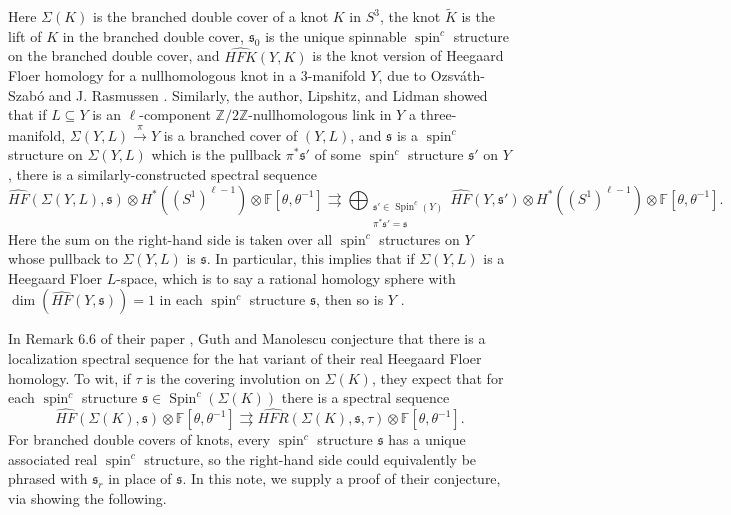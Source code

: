 \documentclass[11pt,reqno]{amsart}
\theoremstyle{definition}
\theoremstyle{remark}
\renewcommand{\subset}{\subseteq}
\DeclareMathOperator{\spin}{{spin}}
\DeclareMathOperator{\Spin}{{Spin}}
\newcommand{\bF}{\mathbb{F}}
\newcommand{\HF}{\mathit{HF}}
\newcommand{\HFK}{\mathit{HFK}}
\newcommand\HFhat{\widehat{\HF}}
\newcommand\HFKhat{\widehat{\HFK}}
\numberwithin{equation}{section}
\begin{document}
Here $\Sigma(K)$ is the branched double cover of a knot $K$ in $S^3$, the knot $\widetilde{K}$ is the lift of $K$ in the branched double cover, $\mathfrak s_0$ is the unique spinnable $\spin^c$ structure on the branched double cover, and $\HFKhat(Y,K)$ is the knot version of Heegaard Floer homology for a nullhomologous knot in a 3-manifold $Y$, due to Ozsv{\'a}th-Szab{\'o} \cite{OSKnots, OSLinks} and J. Rasmussen \cite{RasmussenKnots}. Similarly, the author, Lipshitz, and Lidman \cite{HLL:branched} showed that if $L \subset Y$ is an $\ell$-component $\mathbb Z/2\mathbb Z$-nullhomologous link in $Y$ a three-manifold, $\Sigma(Y,L) \xrightarrow{\pi} Y$ is a branched cover of $(Y,L)$, and $\mathfrak s$ is a $\spin^c$ structure on $\Sigma(Y,L)$ which is the pullback $\pi^{*}\mathfrak s'$ of some $\spin^c$ structure $\mathfrak s'$ on $Y$, there is a similarly-constructed spectral sequence
%
\begin{equation}\label{eqn:original-manifolds} \HFhat(\Sigma(Y,L), \mathfrak s) \otimes H^*((S^1)^{\ell -1}) \otimes  \bF[\theta, \theta^{-1}] \rightrightarrows \bigoplus_{\substack{\mathfrak s'\in \Spin^c(Y) \\ \pi^* \mathfrak s' = \mathfrak s}} \HFhat(Y, \mathfrak s') \otimes H^*((S^1)^{\ell -1}) \otimes \bF[\theta, \theta^{-1}].\end{equation}
%
Here the sum on the right-hand side is taken over all $\spin^c$ structures on $Y$ whose pullback to $\Sigma(Y,L)$ is $\mathfrak s$. In particular, this implies that if $\Sigma(Y,L)$ is a Heegaard Floer $L$-space, which is to say a rational homology sphere with $\dim (\HFhat(Y, \mathfrak s)) = 1$ in each $\spin^c$ structure $\mathfrak s$, then so is $Y$ \cite[Corollary 1.2]{HLL:branched}.

In Remark 6.6 of their paper \cite{GM:real}, Guth and Manolescu conjecture that there is a localization spectral sequence for the hat variant of their real Heegaard Floer homology. To wit, if $\tau$ is the covering involution on $\Sigma(K)$, they expect that for each $\spin^c$ structure $\mathfrak s \in \Spin^c(\Sigma(K))$ there is a spectral sequence
%
\[ \HFhat(\Sigma(K), \mathfrak s) \otimes \bF[\theta, \theta^{-1}] \rightrightarrows \widehat{HFR}(\Sigma(K), \mathfrak s, \tau) \otimes \bF[\theta, \theta^{-1}]. \]
%
For branched double covers of knots, every $\spin^c$ structure $\mathfrak s$ has a unique associated real $\spin^c$ structure, so the right-hand side could equivalently be phrased with $\mathfrak s_r$ in place of $\mathfrak s$. In this note, we supply a proof of their conjecture, via showing the following.
\end{document}
